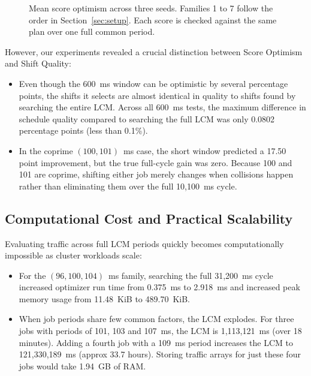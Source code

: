 \documentclass[conference]{IEEEtran}
\begin{document}
\begin{figure}[t]
\centering
{}
\caption{Mean score optimism across three seeds. Families 1 to 7 follow the order in Section~\ref{sec:setup}. Each score is checked against the same plan over one full common period.}
\label{fig:lcm-results}
\end{figure}

However, our experiments revealed a crucial distinction between Score Optimism and Shift Quality:
\begin{itemize}
    \item Even though the 600~ms window can be optimistic by several percentage points, the shifts it selects are almost identical in quality to shifts found by searching the entire LCM. Across all 600~ms tests, the maximum difference in schedule quality compared to searching the full LCM was only 0.0802 percentage points (less than 0.1\%).
    \item In the coprime $(100, 101)$~ms case, the short window predicted a 17.50 point improvement, but the true full-cycle gain was zero. Because 100 and 101 are coprime, shifting either job merely changes when collisions happen rather than eliminating them over the full 10,100~ms cycle.
\end{itemize}

\subsection{Computational Cost and Practical Scalability}

Evaluating traffic across full LCM periods quickly becomes computationally impossible as cluster workloads scale:
\begin{itemize}
    \item For the $(96, 100, 104)$~ms family, searching the full 31,200~ms cycle increased optimizer run time from 0.375~ms to 2.918~ms and increased peak memory usage from 11.48~KiB to 489.70~KiB.
    \item When job periods share few common factors, the LCM explodes. For three jobs with periods of 101, 103 and 107~ms, the LCM is 1,113,121~ms (over 18 minutes). Adding a fourth job with a 109~ms period increases the LCM to 121,330,189~ms (approx 33.7 hours). Storing traffic arrays for just these four jobs would take 1.94~GB of RAM.
\end{itemize}
\end{document}
